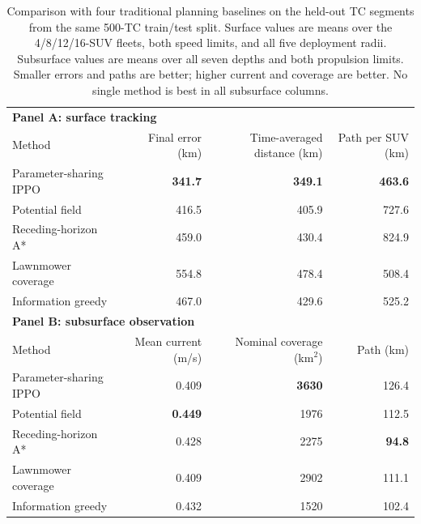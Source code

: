 \begin{table}[t]
\centering
\caption{Comparison with four traditional planning baselines on the held-out
TC segments from the same 500-TC train/test split. Surface values are means
over the 4/8/12/16-SUV fleets, both speed limits, and all five deployment
radii. Subsurface values are means over all seven depths and both propulsion
limits. Smaller errors and paths are better; higher current and coverage are
better. No single method is best in all subsurface columns.}
\label{tab:classical_planners}
\small
\begin{tabular*}{\textwidth}{@{\extracolsep{\fill}}lrrr@{}}
\toprule
\multicolumn{4}{l}{\textbf{Panel A: surface tracking}}\\
Method & Final error (km) & Time-averaged distance (km) & Path per SUV (km)\\
\midrule
Parameter-sharing IPPO & \textbf{341.7} & \textbf{349.1} & \textbf{463.6} \\
Potential field & 416.5 & 405.9 & 727.6 \\
Receding-horizon A* & 459.0 & 430.4 & 824.9 \\
Lawnmower coverage & 554.8 & 478.4 & 508.4 \\
Information greedy & 467.0 & 429.6 & 525.2 \\
\midrule
\multicolumn{4}{l}{\textbf{Panel B: subsurface observation}}\\
Method & Mean current (m/s) & Nominal coverage (km$^2$) & Path (km)\\
\midrule
Parameter-sharing IPPO & 0.409 & \textbf{3630} & 126.4 \\
Potential field & \textbf{0.449} & 1976 & 112.5 \\
Receding-horizon A* & 0.428 & 2275 & \textbf{94.8} \\
Lawnmower coverage & 0.409 & 2902 & 111.1 \\
Information greedy & 0.432 & 1520 & 102.4 \\
\bottomrule
\end{tabular*}
\end{table}
